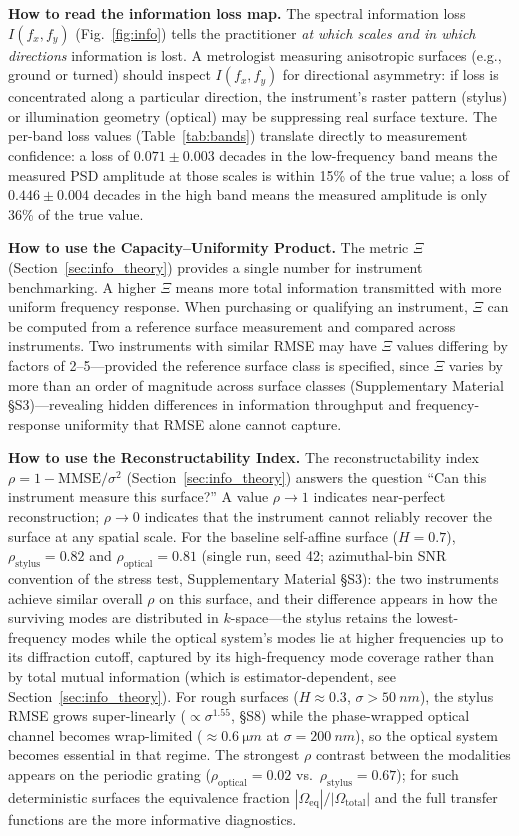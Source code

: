 \documentclass[review,12pt]{elsarticle}
\begin{document}
\textbf{How to read the information loss map.} The spectral information loss $I(f_x,f_y)$ (Fig.~\ref{fig:info}) tells the practitioner \emph{at which scales and in which directions} information is lost. A metrologist measuring anisotropic surfaces (e.g., ground or turned) should inspect $I(f_x,f_y)$ for directional asymmetry: if loss is concentrated along a particular direction, the instrument's raster pattern (stylus) or illumination geometry (optical) may be suppressing real surface texture. The per-band loss values (Table~\ref{tab:bands}) translate directly to measurement confidence: a loss of $0.071\pm0.003$ decades in the low-frequency band means the measured PSD amplitude at those scales is within 15\% of the true value; a loss of $0.446\pm0.004$ decades in the high band means the measured amplitude is only 36\% of the true value.

\textbf{How to use the Capacity--Uniformity Product.} The metric $\Xi$ (Section~\ref{sec:info_theory}) provides a single number for instrument benchmarking. A higher $\Xi$ means more total information transmitted with more uniform frequency response. When purchasing or qualifying an instrument, $\Xi$ can be computed from a reference surface measurement and compared across instruments. Two instruments with similar RMSE may have $\Xi$ values differing by factors of 2--5---provided the reference surface class is specified, since $\Xi$ varies by more than an order of magnitude across surface classes (Supplementary Material \S S3)---revealing hidden differences in information throughput and frequency-response uniformity that RMSE alone cannot capture.

\textbf{How to use the Reconstructability Index.} The reconstructability index $\rho = 1 - \mathrm{MMSE}/\sigma^2$ (Section~\ref{sec:info_theory}) answers the question ``Can this instrument measure this surface?'' A value $\rho \to 1$ indicates near-perfect reconstruction; $\rho \to 0$ indicates that the instrument cannot reliably recover the surface at any spatial scale. For the baseline self-affine surface ($H=0.7$), $\rho_\mathrm{stylus} = 0.82$ and $\rho_\mathrm{optical} = 0.81$ (single run, seed 42; azimuthal-bin SNR convention of the stress test, Supplementary Material \S S3): the two instruments achieve similar overall $\rho$ on this surface, and their difference appears in how the surviving modes are distributed in $k$-space---the stylus retains the lowest-frequency modes while the optical system's modes lie at higher frequencies up to its diffraction cutoff, captured by its high-frequency mode coverage rather than by total mutual information (which is estimator-dependent, see Section~\ref{sec:info_theory}). For rough surfaces ($H \approx 0.3$, $\sigma > \SI{50}{nm}$), the stylus RMSE grows super-linearly ($\propto\sigma^{1.55}$, \S S8) while the phase-wrapped optical channel becomes wrap-limited ($\approx\SI{0.6}{\micro m}$ at $\sigma=\SI{200}{nm}$), so the optical system becomes essential in that regime. The strongest $\rho$ contrast between the modalities appears on the periodic grating ($\rho_\mathrm{optical} = 0.02$ vs.\ $\rho_\mathrm{stylus} = 0.67$); for such deterministic surfaces the equivalence fraction $|\Omega_\mathrm{eq}|/|\Omega_\mathrm{total}|$ and the full transfer functions are the more informative diagnostics.
\end{document}
